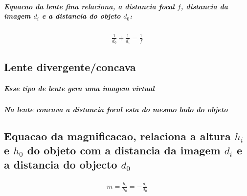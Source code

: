 \documentclass[12pt,twoside, a4paper, twocolumn]{article}
\begin{document}
\subparagraph*{Equacao da lente fina relaciona, a distancia focal $f$, distancia da imagem $d_i$ e a distancia do objeto $d_0$:}

\begin{equation}
    \begin{aligned}
        \frac{1}{d_0} + \frac{1}{d_i} = \frac{1}{f}
    \end{aligned}
\end{equation}

\subsection{Lente divergente/concava}

\subparagraph*{Esse tipo de lente gera uma imagem virtual}
\subparagraph*{Na lente concava a distancia focal esta do mesmo lado do objeto}


\subsection{Equacao da magnificacao, relaciona a altura $h_i$ e $h_0$ do objeto com a distancia da imagem $d_i$ e a distancia do objecto $d_0$}

\begin{equation}
    \begin{aligned}
        m = \frac{h_i}{h_0} = - \frac{d_i}{d_0}
    \end{aligned}
\end{equation}
\end{document}
